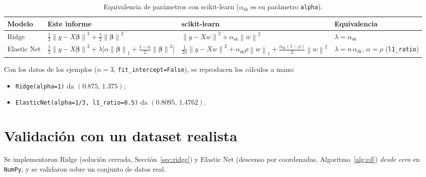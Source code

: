 \documentclass[11pt,a4paper]{article}
\newcommand{\norm}[1]{\left\lVert #1 \right\rVert}
\newcommand{\bt}{\bm{\beta}}
\theoremstyle{simple}
\begin{document}
\begin{table}[H]
\centering
\caption{Equivalencia de parámetros con scikit-learn ($\alpha_{\mathrm{sk}}$ es su parámetro \texttt{alpha}).}\label{tab:sklearn}
\small
\renewcommand{\arraystretch}{1.4}
\begin{tabular}{@{}L{1.7cm}L{4.9cm}L{5.6cm}L{2.7cm}@{}}
\toprule
\textbf{Modelo} & \textbf{Este informe} & \textbf{scikit-learn} & \textbf{Equivalencia}\\
\midrule
Ridge & $\tfrac12\norm{y-X\bt}^2+\tfrac\lambda2\norm{\bt}^2$ & $\norm{y-Xw}^2+\alpha_{\mathrm{sk}}\norm{w}^2$ & $\lambda=\alpha_{\mathrm{sk}}$\\[4pt]
Elastic Net & $\tfrac12\norm{y-X\bt}^2+\lambda\big[\alpha\norm{\bt}_1+\tfrac{1-\alpha}2\norm{\bt}^2\big]$ & $\tfrac1{2n}\norm{y-Xw}^2+\alpha_{\mathrm{sk}}\rho\norm{w}_1+\tfrac{\alpha_{\mathrm{sk}}(1-\rho)}2\norm{w}^2$ & $\lambda=n\,\alpha_{\mathrm{sk}}$, $\alpha=\rho$ (\texttt{l1\_ratio})\\
\bottomrule
\end{tabular}
\end{table}

Con los datos de los ejemplos ($n=3$, \texttt{fit\_intercept=False}), se reproducen los cálculos a mano:
\begin{itemize}
\item \texttt{Ridge(alpha=1)} da $(0.875,\,1.375)$;
\item \texttt{ElasticNet(alpha=1/3, l1\_ratio=0.5)} da $(0.8095,\,1.4762)$.
\end{itemize}

\section{Validación con un dataset realista}\label{sec:dataset}
Se implementaron Ridge (solución cerrada, Sección~\ref{sec:ridge}) y Elastic Net (descenso por coordenadas, Algoritmo~\ref{alg:cd}) \emph{desde cero} en \texttt{NumPy}, y se validaron sobre un conjunto de datos real.
\end{document}

